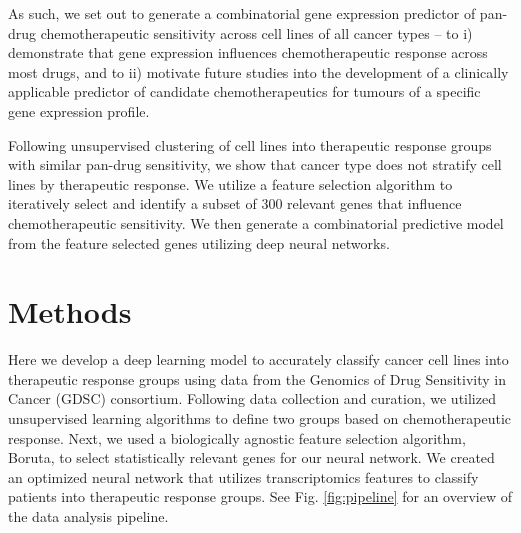 \documentclass[10pt, letterpaper]{article}
\begin{document}
\begin{multicols}{2}
As such, we set out to generate a combinatorial gene expression predictor of pan-drug chemotherapeutic sensitivity across cell lines of all cancer types – to i) demonstrate that gene expression influences chemotherapeutic response across most drugs, and to ii) motivate future studies into the development of a clinically applicable predictor of candidate chemotherapeutics for tumours of a specific gene expression profile.

Following unsupervised clustering of cell lines into therapeutic response groups with similar pan-drug sensitivity, we show that cancer type does not stratify cell lines by therapeutic response. We utilize a feature selection algorithm to iteratively select and identify a subset of 300 relevant genes that influence chemotherapeutic sensitivity. We then generate a combinatorial predictive model from the feature selected genes utilizing deep neural networks.


\section{Methods}

Here we develop a deep learning model to accurately classify cancer cell lines  into therapeutic response groups using data from the Genomics of Drug Sensitivity in Cancer (GDSC) consortium. Following data collection and curation, we utilized unsupervised learning algorithms to define two groups based on chemotherapeutic response. Next, we used a biologically agnostic feature selection algorithm, Boruta, to select statistically relevant genes for our neural network. We created an optimized neural network that utilizes transcriptomics features to classify patients into therapeutic response groups. See Fig. \ref{fig:pipeline} for an overview of the data analysis pipeline.



\end{multicols}
\end{document}
